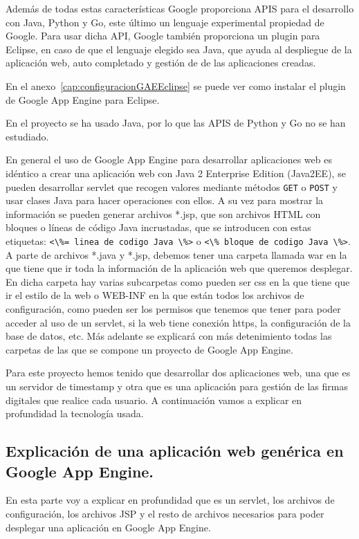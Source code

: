 \begin{itemize}
Además de todas estas características Google proporciona APIS para el desarrollo con Java, Python y Go, este último un lenguaje experimental propiedad de Google. Para usar dicha API, Google también proporciona un plugin para Eclipse, en caso de que el lenguaje elegido sea Java, que ayuda al despliegue de la aplicación web, auto completado y gestión de de las aplicaciones creadas. 

En el anexo~\ref{cap:configuracionGAEEclipse} se puede ver como instalar el plugin de Google App Engine para Eclipse.

En el proyecto se ha usado Java, por lo que las APIS de Python y Go no se han estudiado.

En general el uso de Google App Engine para desarrollar aplicaciones web es idéntico a crear una aplicación web con Java 2 Enterprise Edition (Java2EE), se pueden desarrollar servlet que recogen valores mediante métodos \lstinline{GET} o \lstinline{POST} y usar clases Java para hacer operaciones con ellos. A su vez para mostrar la información se pueden generar archivos *.jsp, que son archivos HTML con bloques o líneas de código Java incrustadas, que se introducen con estas etiquetas: \lstinline{<\%= linea de codigo Java \%>} o \lstinline{<\% bloque de codigo Java \%>}. A parte de archivos *.java y *.jsp, debemos tener una carpeta llamada war en la que tiene que ir toda la información de la aplicación web que queremos desplegar. En dicha carpeta hay varias subcarpetas como pueden ser css en la que tiene que ir el estilo de la web o WEB-INF en la que están todos los archivos de configuración, como pueden ser los permisos que tenemos que tener para poder acceder al uso de un servlet, si la web tiene conexión https, la configuración de la base de datos, etc. Más adelante se explicará con más detenimiento todas las carpetas de las que se compone un proyecto de Google App Engine.

Para este proyecto hemos tenido que desarrollar dos aplicaciones web, una que es un servidor de timestamp y otra que es una aplicación para gestión de las firmas digitales que realice cada usuario. A continuación vamos a explicar en profundidad la tecnología usada.

\subsection[Aplicación web genérica en GAE]{Explicación de una aplicación web genérica en Google App Engine.}
En esta parte voy a explicar en profundidad que es un servlet, los archivos de configuración, los archivos JSP y el resto de archivos necesarios para poder desplegar una aplicación en Google App Engine.
 

\end{itemize}
